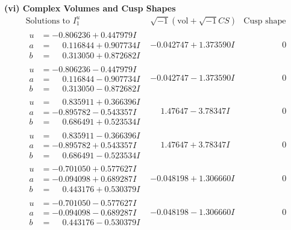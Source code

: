 \documentclass[1p]{elsarticle_modified}
\theoremstyle{definition}
\newcommand{\I}{\sqrt{-1}}
\begin{document}
\newpage\flushleft \textbf{(vi) Complex Volumes and Cusp Shapes}
$$\begin{array}{c|c|c}  
\text{Solutions to }I^u_{1}& \I (\text{vol} + \sqrt{-1}CS) & \text{Cusp shape}\\
 \hline 
\begin{aligned}
u &= -0.806236 + 0.447979 I \\
a &= \phantom{-}0.116844 + 0.907734 I \\
b &= \phantom{-}0.313050 + 0.872682 I\end{aligned}
 & -0.042747 + 1.373590 I & \phantom{-0.000000 } 0 \\ \hline\begin{aligned}
u &= -0.806236 - 0.447979 I \\
a &= \phantom{-}0.116844 - 0.907734 I \\
b &= \phantom{-}0.313050 - 0.872682 I\end{aligned}
 & -0.042747 - 1.373590 I & \phantom{-0.000000 } 0 \\ \hline\begin{aligned}
u &= \phantom{-}0.835911 + 0.366396 I \\
a &= -0.895782 - 0.543357 I \\
b &= \phantom{-}0.686491 + 0.523534 I\end{aligned}
 & \phantom{-}1.47647 - 3.78347 I & \phantom{-0.000000 } 0 \\ \hline\begin{aligned}
u &= \phantom{-}0.835911 - 0.366396 I \\
a &= -0.895782 + 0.543357 I \\
b &= \phantom{-}0.686491 - 0.523534 I\end{aligned}
 & \phantom{-}1.47647 + 3.78347 I & \phantom{-0.000000 } 0 \\ \hline\begin{aligned}
u &= -0.701050 + 0.577627 I \\
a &= -0.094098 + 0.689287 I \\
b &= \phantom{-}0.443176 + 0.530379 I\end{aligned}
 & -0.048198 + 1.306660 I & \phantom{-0.000000 } 0 \\ \hline\begin{aligned}
u &= -0.701050 - 0.577627 I \\
a &= -0.094098 - 0.689287 I \\
b &= \phantom{-}0.443176 - 0.530379 I\end{aligned}
 & -0.048198 - 1.306660 I & \phantom{-0.000000 } 0 \\ \hline\begin{aligned}

\end{aligned}
\end{array}$$
\end{document}
